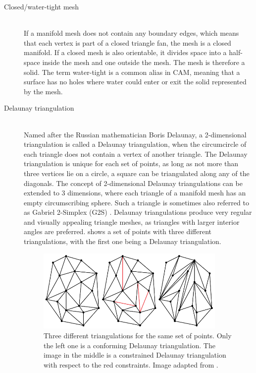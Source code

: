 \begin{description}
	\item[Closed/water-tight mesh] \hfill \\
	If a manifold mesh does not contain any boundary edges, which means that each vertex is part of a closed triangle fan, the mesh is a closed manifold.
	If a closed mesh is also orientable, it divides space into a half-space inside the mesh and one outside the mesh.
	The mesh is therefore a solid.
	The term water-tight is a common alias in CAM, meaning that a surface has no holes where water could enter or exit the solid represented by the mesh.




	\item[Delaunay triangulation] \hfill \\
	Named after the Russian mathematician Boris Delaunay, a 2-dimensional triangulation is called a Delaunay triangulation, when the circumcircle of each triangle does not contain a vertex of another triangle.
	The Delaunay triangulation is unique for each set of points, as long as not more than three vertices lie on a circle, \eg a square can be triangulated along any of the diagonals.
	The concept of 2-dimensional Delaunay triangulations can be extended to 3 dimensions, where each triangle of a manifold mesh has an empty circumscribing sphere.
	Such a triangle is sometimes also referred to as Gabriel 2-Simplex (G2S) \cite{g2s}.
	Delaunay triangulations produce very regular and visually appealing triangle meshes, as triangles with larger interior angles are preferred.
	 shows a set of points with three different triangulations, with the first one being a Delaunay triangulation.

	\begin{figure}[H]
		\centering
		\includegraphics[width=0.9\textwidth]{images/delaunay_triangulation}
		\caption{
			Three different triangulations for the same set of points.
			Only the left one is a conforming Delaunay triangulation.
			The image in the middle is a constrained Delaunay triangulation with respect to the red constraints.
			Image adapted from \cite{delaunay_image}.
		}
		\label{fig:delaunay_triangulation}
	\end{figure}



\end{description}
